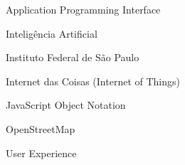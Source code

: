 
\begin{siglas}
    \item[API] Application Programming Interface
    \item[IA] Inteligência Artificial
    \item[IFSP] Instituto Federal de São Paulo
    \item[IoT] Internet das Coisas (Internet of Things)
    \item[JSON] JavaScript Object Notation
    \item[OSM] OpenStreetMap
    \item[UX] User Experience
\end{siglas}

